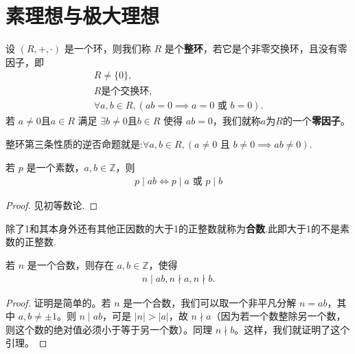 \documentclass[../../main.tex]{subfiles}
\begin{document}
\section{素理想与极大理想}

\begin{definition}[整环]
设 $(R, +, \cdot)$ 是一个环，则我们称 $R$ 是个\textbf{整环}，若它是个非零交换环，且没有零因子，即
\begin{gather*}
R \neq \{0\},
\\
R \text{是个交换环},
\\
\forall a, b \in R, (ab = 0 \implies a = 0 \text{ 或 } b = 0).
\end{gather*}
若 $a \neq 0$且$a\in R$ 满足 $\exists b \neq 0$且$b\in R$ 使得 $ab = 0$，我们就称$a$为$R$的一个\textbf{零因子}。
\end{definition}
\begin{note}
整环第三条性质的逆否命题就是:$\forall a, b \in R, (a \ne 0 \text{ 且 } b \ne 0 \implies ab \ne 0).$
\end{note}

\begin{lemma}\label{lemma:素数的基本性质}
若 $p$ 是一个素数，$a, b \in \mathbb{Z}$，则
\begin{align*}
p \mid ab \iff p \mid a \text{ 或 } p \mid b
\end{align*}
\end{lemma}
\begin{proof}
见初等数论.

\end{proof}

\begin{definition}[合数]
除了1和其本身外还有其他正因数的大于1的正整数就称为\textbf{合数}.此即大于1的不是素数的正整数.
\end{definition}

\begin{lemma}\label{lemma:合数的基本性质}
若 $n$ 是一个合数，则存在 $a, b \in \mathbb{Z}$，使得
\begin{align*}
n \mid ab ,
n \nmid a ,
n \nmid b .
\end{align*}
\end{lemma}
\begin{proof}
证明是简单的。若 $n$ 是一个合数，我们可以取一个非平凡分解 $n = ab$，其中 $a, b \neq \pm 1$。则 $n \mid ab$，可是 $|n| > |a|$，故 $n \nmid a$（因为若一个数整除另一个数，则这个数的绝对值必须小于等于另一个数）。同理 $n \nmid b$。这样，我们就证明了这个引理。 

\end{proof}
\end{document}
